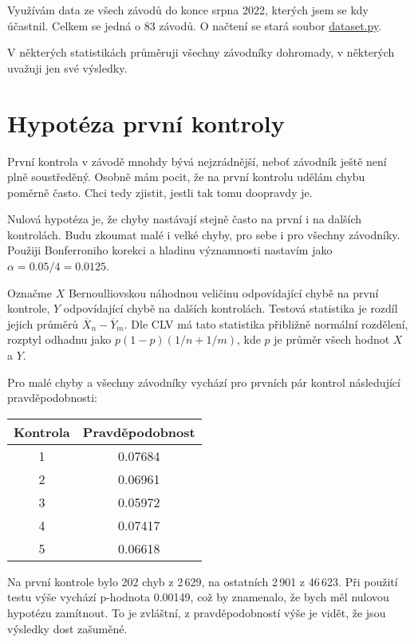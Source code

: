 \documentclass[a4paper,11pt]{article}
\begin{document}
Využívám data ze všech závodů do konce srpna 2022, kterých jsem se kdy účastnil.
Celkem se jedná o 83 závodů. O načtení se stará soubor
\href{https://github.com/kulisak12/mistake-stats/blob/main/dataset.py}{dataset.py}.

V některých statistikách průměruji všechny závodníky dohromady, v některých
uvažuji jen své výsledky.
\pagebreak

\section*{Hypotéza první kontroly}

První kontrola v závodě mnohdy bývá nejzrádnější, neboť závodník ještě není plně
soustředěný. Osobně mám pocit, že na první kontrolu udělám chybu poměrně často.
Chci tedy zjistit, jestli tak tomu doopravdy je.

Nulová hypotéza je, že chyby nastávají stejně často na první i na dalších
kontrolách. Budu zkoumat malé i velké chyby, pro sebe i pro všechny závodníky.
Použiji Bonferroniho korekci a hladinu významnosti nastavím jako
$\alpha = 0.05 / 4 = 0.0125$.

Označme $X$ Bernoulliovskou náhodnou veličinu odpovídající chybě na první
kontrole, $Y$ odpovídající chybě na dalších kontrolách. Testová statistika je
rozdíl jejich průměrů $\overline{X}_n - \overline{Y}_m$. Dle CLV má tato
statistika přibližně normální rozdělení, rozptyl odhadnu jako
$p (1-p) (1/n + 1/m)$, kde $p$ je průměr všech hodnot $X$ a $Y$.

Pro malé chyby a všechny závodníky vychází pro prvních pár kontrol následující
pravděpodobnosti:

\begin{tabular}{c | c}
    Kontrola & Pravděpodobnost \\
    \hline
    1        & 0.07684         \\
    2        & 0.06961         \\
    3        & 0.05972         \\
    4        & 0.07417         \\
    5        & 0.06618         \\
\end{tabular}

Na první kontrole bylo 202 chyb z 2\,629, na ostatních 2\,901 z 46\,623. Při
použití testu výše vychází p-hodnota 0.00149, což by znamenalo, že bych měl
nulovou hypotézu zamítnout. To je zvláštní, z pravděpodobností výše je vidět, že
jsou výsledky dost zašuměné.
\end{document}
